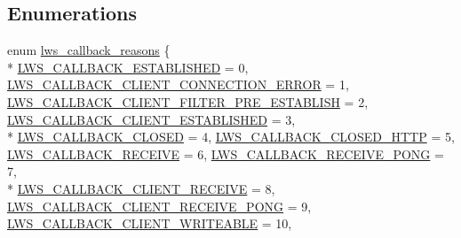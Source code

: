 \subsection*{Enumerations}
\begin{DoxyCompactItemize}
\item 
enum \hyperlink{group__usercb_gad62860e19975ba4c4af401c3cdb6abf7}{lws\+\_\+callback\+\_\+reasons} \{ \\*
\hyperlink{group__usercb_ggad62860e19975ba4c4af401c3cdb6abf7a24d39bf1cfc0bad9d92da9ac1717e439}{L\+W\+S\+\_\+\+C\+A\+L\+L\+B\+A\+C\+K\+\_\+\+E\+S\+T\+A\+B\+L\+I\+S\+H\+ED} = 0, 
\hyperlink{group__usercb_ggad62860e19975ba4c4af401c3cdb6abf7ad8c6207b0c4e732f3d507f0fb79370e8}{L\+W\+S\+\_\+\+C\+A\+L\+L\+B\+A\+C\+K\+\_\+\+C\+L\+I\+E\+N\+T\+\_\+\+C\+O\+N\+N\+E\+C\+T\+I\+O\+N\+\_\+\+E\+R\+R\+OR} = 1, 
\hyperlink{group__usercb_ggad62860e19975ba4c4af401c3cdb6abf7aa536e574a642ff3ab9e12bff7ba2c6a2}{L\+W\+S\+\_\+\+C\+A\+L\+L\+B\+A\+C\+K\+\_\+\+C\+L\+I\+E\+N\+T\+\_\+\+F\+I\+L\+T\+E\+R\+\_\+\+P\+R\+E\+\_\+\+E\+S\+T\+A\+B\+L\+I\+SH} = 2, 
\hyperlink{group__usercb_ggad62860e19975ba4c4af401c3cdb6abf7a7e12418eec9bce85735e6460176ab604}{L\+W\+S\+\_\+\+C\+A\+L\+L\+B\+A\+C\+K\+\_\+\+C\+L\+I\+E\+N\+T\+\_\+\+E\+S\+T\+A\+B\+L\+I\+S\+H\+ED} = 3, 
\\*
\hyperlink{group__usercb_ggad62860e19975ba4c4af401c3cdb6abf7a48a9590e5e18c7920282e094a0bfd9d8}{L\+W\+S\+\_\+\+C\+A\+L\+L\+B\+A\+C\+K\+\_\+\+C\+L\+O\+S\+ED} = 4, 
\hyperlink{group__usercb_ggad62860e19975ba4c4af401c3cdb6abf7a838b18d255c1b94a533287ba302a2eba}{L\+W\+S\+\_\+\+C\+A\+L\+L\+B\+A\+C\+K\+\_\+\+C\+L\+O\+S\+E\+D\+\_\+\+H\+T\+TP} = 5, 
\hyperlink{group__usercb_ggad62860e19975ba4c4af401c3cdb6abf7a492c1b1c0ac0ed980042ee732fe2990c}{L\+W\+S\+\_\+\+C\+A\+L\+L\+B\+A\+C\+K\+\_\+\+R\+E\+C\+E\+I\+VE} = 6, 
\hyperlink{group__usercb_ggad62860e19975ba4c4af401c3cdb6abf7a2db02fc6e1c17ab62b52109d1aa9d738}{L\+W\+S\+\_\+\+C\+A\+L\+L\+B\+A\+C\+K\+\_\+\+R\+E\+C\+E\+I\+V\+E\+\_\+\+P\+O\+NG} = 7, 
\\*
\hyperlink{group__usercb_ggad62860e19975ba4c4af401c3cdb6abf7abbbe7a0a67c5866ca9109d46823fc5b1}{L\+W\+S\+\_\+\+C\+A\+L\+L\+B\+A\+C\+K\+\_\+\+C\+L\+I\+E\+N\+T\+\_\+\+R\+E\+C\+E\+I\+VE} = 8, 
\hyperlink{group__usercb_ggad62860e19975ba4c4af401c3cdb6abf7a136a7cec11c3afd13245623bd84e76c9}{L\+W\+S\+\_\+\+C\+A\+L\+L\+B\+A\+C\+K\+\_\+\+C\+L\+I\+E\+N\+T\+\_\+\+R\+E\+C\+E\+I\+V\+E\+\_\+\+P\+O\+NG} = 9, 
\hyperlink{group__usercb_ggad62860e19975ba4c4af401c3cdb6abf7a8e8b2e6dbeac76d8d126947d2166a514}{L\+W\+S\+\_\+\+C\+A\+L\+L\+B\+A\+C\+K\+\_\+\+C\+L\+I\+E\+N\+T\+\_\+\+W\+R\+I\+T\+E\+A\+B\+LE} = 10, 

\end{DoxyCompactItemize}
